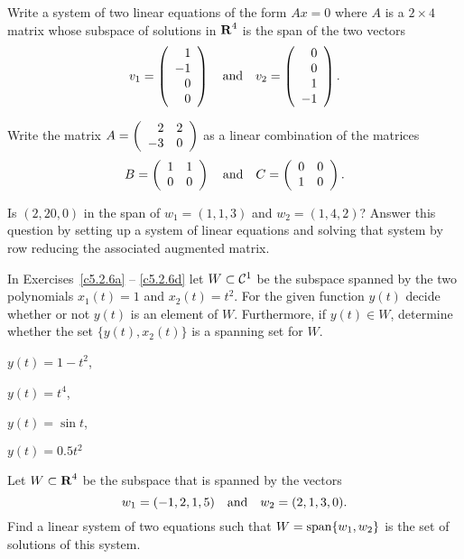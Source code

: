\begin{exercise} \label{c5.2.3}
Write a system of two linear equations of the form $Ax=0$ where
$A$ is a $2\times 4$ matrix whose subspace of solutions in $\mbox{$\bf{R}$}^4$
is the span of the two vectors
\[
v_1 = \left(\begin{array}{r} 1 \\ -1 \\ 0 \\  0 \end{array}\right) \quad\mbox{and}\quad
v_2 = \left(\begin{array}{r} 0 \\  0 \\ 1 \\ -1 \end{array}\right).
\]
\end{exercise}

\begin{exercise} \label{c5.2.4}
Write the matrix $A=\left(\begin{array}{rr} 2 & 2\\ -3 &0\end{array}\right)$ as a linear combination
of the matrices
\[
B=\left(\begin{array}{rr} 1 & 1\\ 0 &0\end{array}\right) \quad\mbox{and}\quad C=\left(\begin{array}{rr} 0 & 0\\ 1 &0\end{array}\right).
\]
\end{exercise}

\begin{exercise} \label{c5.2.5}
Is $(2,20,0)$ in the span of $w_1=(1,1,3)$ and $w_2=(1,4,2)$?
Answer this question by setting up a system of linear equations
and solving that system by row reducing the associated augmented
matrix.
\end{exercise}

\noindent In Exercises~\ref{c5.2.6a} -- \ref{c5.2.6d} let $W\subset{\cal C}^1$
be the subspace spanned by the two polynomials $x_1(t) = 1$ and
$x_2(t)=t^2$.  For the given function $y(t)$ decide whether or not $y(t)$
is an element of $W$.  Furthermore, if $y(t)\in W$, determine whether the set
$\{y(t),x_2(t)\}$ is a spanning set for $W$.
\begin{exercise} \label{c5.2.6a}
$y(t) = 1-t^2$,
\end{exercise}
\begin{exercise} \label{c5.2.6b}
$y(t) = t^4$,
\end{exercise}
\begin{exercise} \label{c5.2.6c}
$y(t) = \sin t$,
\end{exercise}
\begin{exercise} \label{c5.2.6d}
$y(t) = 0.5 t^2$
\end{exercise}

\begin{exercise} \label{c5.2.7}
Let $W\subset\mbox{$\bf{R}$}^4$ be the subspace that is spanned by the vectors
\[
        w_1=(-1,2,1,5)\quad\mbox{and}\quad w_2=(2,1,3,0).
\]
Find a linear system of two equations such that
$W={\rm span}\{w_1,w_2\}$ is the set of solutions of this system.
\end{exercise}


